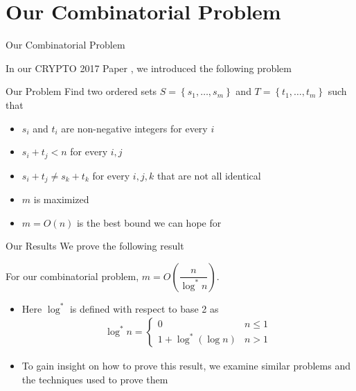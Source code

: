 \section{Our Combinatorial Problem}
\begin{frame}{Our Combinatorial Problem}

In our CRYPTO 2017 Paper \cite{C:BloMajNgu17}, we introduced the following problem

{
\begin{block}{Our Problem}
	Find two ordered sets $S = \left\lbrace s_1,\dotsc, s_m\right\rbrace$ and $T = \left\lbrace t_1,\dotsc, t_m\right\rbrace$ such that
	\begin{itemize}
		\item $s_i$ and $t_i$ are non-negative integers for every $i$
		\item $s_i + t_j < n$ for every $i,j$
		\item $s_i + t_j \neq s_k + t_k$ for every $i,j,k$ that are not all identical
		\item $m$ is maximized
	\end{itemize}
\end{block}}


\begin{itemize}
	\item<4-> $m = O(n)$ is the best bound we can hope for
\end{itemize}

\end{frame}

\begin{frame}{Our Results}
	We prove the following result
	{
	\begin{theorem}
		For our combinatorial problem, $m = O\left(\dfrac{n}{\log^*n}\right)$.
	\end{theorem}}

\begin{itemize}
	\item<2-> Here $\log^*$ is defined with respect to base 2 as
	\begin{align*}
		\log^* n = \begin{cases}
			0 & n\leq 1\\
			1 + \log^*(\log n) & n > 1
		\end{cases}
	\end{align*}
	\item<3-> To gain insight on how to prove this result, we examine similar problems and the techniques used to prove them
\end{itemize}

\end{frame}

